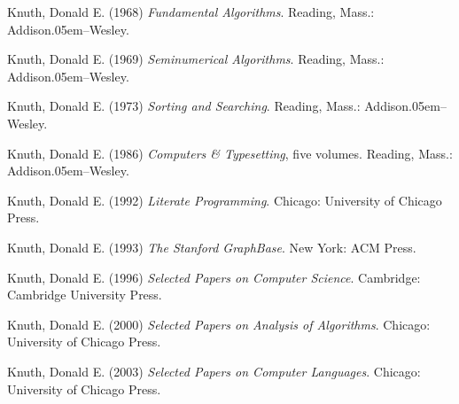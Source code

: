 \medskip
\bib
Knuth, Donald E. (1968) {\sl Fundamental Algorithms}. Reading, Mass.:
Addison\kern.05em--Wesley. 

\medskip
\bib
Knuth, Donald E. (1969) {\sl Seminumerical Algorithms}. Reading, Mass.:
Addison\kern.05em--Wesley. 

\medskip
\bib
Knuth, Donald E. (1973) {\sl Sorting and Searching}. Reading, Mass.:
Addison\kern.05em--Wesley. 

\medskip
\bib
Knuth, Donald E. (1986) {\sl Computers \& Typesetting}, five volumes.
Reading, Mass.: Addison\kern.05em--Wesley. 

\medskip
\bib
Knuth, Donald E. (1992) {\sl Literate Programming}.
Chicago: University of Chicago Press.

\medskip
\bib
Knuth, Donald E. (1993) {\sl The Stanford GraphBase}.
New York: ACM Press.

\medskip
\bib
Knuth, Donald E. (1996) {\sl Selected Papers on Computer Science}.
Cambridge: Cambridge University Press.

\medskip
\bib
Knuth, Donald E. (2000) {\sl Selected Papers on Analysis of Algorithms}.
Chicago: University of Chicago Press.

\medskip
\bib
Knuth, Donald E. (2003) {\sl Selected Papers on Computer Languages}.
Chicago: University of Chicago Press.

\bye



